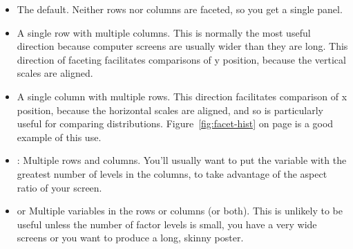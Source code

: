 \begin{itemize}
  \item {}   The default. Neither rows nor columns are faceted, so you get a single panel.

    

  \item {} A single row with multiple columns.  This is normally the most useful direction because computer screens are usually wider than they are long.  This direction of faceting facilitates comparisons of y position, because the vertical scales are aligned.

    
  
  \item {} A single column with multiple rows.  This direction facilitates comparison of x position, because the horizontal scales are aligned, and so is particularly useful for comparing distributions.  Figure~\ref{fig:facet-hist} on page \pageref{fig:facet-hist} is a good example of this use.

    

  \item {}: Multiple rows and columns.  You'll usually want to put the variable with the greatest number of levels in the columns, to take advantage of the aspect ratio of your screen.

    

  \item {} or   Multiple variables in the rows or columns (or both). This is unlikely to be useful unless the number of factor levels is small, you have a very wide screens or you want to produce a long, skinny poster.

    

\end{itemize}

